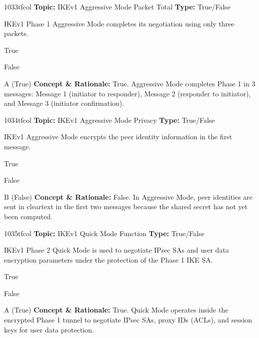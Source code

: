 \begin{qcard}{1033}{tfcol}
\textcolor{darkslate!75}{\small\textbf{Topic:} IKEv1 Aggressive Mode Packet Total \hfill \textbf{Type:} True/False}\vspace{0.4em}\par
IKEv1 Phase 1 Aggressive Mode completes its negotiation using only three packets.
\begin{qoptions}
\item True
\item False
\end{qoptions}
\end{qcard}
\nopagebreak
\begin{explainbox}{A (True)}
\textbf{Concept \& Rationale:} True. Aggressive Mode completes Phase 1 in 3 messages: Message 1 (initiator to responder), Message 2 (responder to initiator), and Message 3 (initiator confirmation).
\end{explainbox}

\begin{qcard}{1034}{tfcol}
\textcolor{darkslate!75}{\small\textbf{Topic:} IKEv1 Aggressive Mode Privacy \hfill \textbf{Type:} True/False}\vspace{0.4em}\par
IKEv1 Aggressive Mode encrypts the peer identity information in the first message.
\begin{qoptions}
\item True
\item False
\end{qoptions}
\end{qcard}
\nopagebreak
\begin{explainbox}{B (False)}
\textbf{Concept \& Rationale:} False. In Aggressive Mode, peer identities are sent in cleartext in the first two messages because the shared secret has not yet been computed.
\end{explainbox}

\begin{qcard}{1035}{tfcol}
\textcolor{darkslate!75}{\small\textbf{Topic:} IKEv1 Quick Mode Function \hfill \textbf{Type:} True/False}\vspace{0.4em}\par
IKEv1 Phase 2 Quick Mode is used to negotiate IPsec SAs and user data encryption parameters under the protection of the Phase 1 IKE SA.
\begin{qoptions}
\item True
\item False
\end{qoptions}
\end{qcard}
\nopagebreak
\begin{explainbox}{A (True)}
\textbf{Concept \& Rationale:} True. Quick Mode operates inside the encrypted Phase 1 tunnel to negotiate IPsec SAs, proxy IDs (ACLs), and session keys for user data protection.
\end{explainbox}

